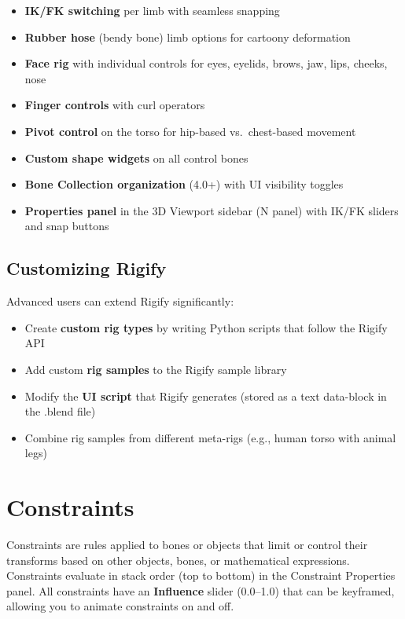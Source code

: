 \begin{itemize}[leftmargin=2em]
  \item \textbf{IK/FK switching} per limb with seamless snapping
  \item \textbf{Rubber hose} (bendy bone) limb options for cartoony deformation
  \item \textbf{Face rig} with individual controls for eyes, eyelids, brows, jaw, lips, cheeks, nose
  \item \textbf{Finger controls} with curl operators
  \item \textbf{Pivot control} on the torso for hip-based vs.\ chest-based movement
  \item \textbf{Custom shape widgets} on all control bones
  \item \textbf{Bone Collection organization} (4.0+) with UI visibility toggles
  \item \textbf{Properties panel} in the 3D Viewport sidebar (N panel) with IK/FK sliders and snap buttons
\end{itemize}

\subsection{Customizing Rigify}

Advanced users can extend Rigify significantly:

\begin{itemize}[leftmargin=2em]
  \item Create \textbf{custom rig types} by writing Python scripts that follow the Rigify API
  \item Add custom \textbf{rig samples} to the Rigify sample library
  \item Modify the \textbf{UI script} that Rigify generates (stored as a text data-block in the .blend file)
  \item Combine rig samples from different meta-rigs (e.g., human torso with animal legs)
\end{itemize}


\section{Constraints}
\label{sec:constraints}

Constraints are rules applied to bones or objects that limit or control their transforms based on other objects, bones, or mathematical expressions. Constraints evaluate in stack order (top to bottom) in the Constraint Properties panel. All constraints have an \textbf{Influence} slider (0.0--1.0) that can be keyframed, allowing you to animate constraints on and off.

